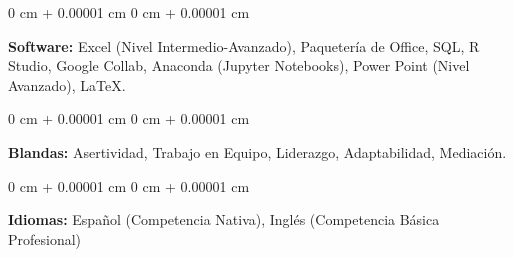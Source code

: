 \documentclass[10pt, letterpaper]{article}
\newenvironment{highlights}{
    \begin{itemize}[
        topsep=0.10 cm,
        parsep=0.10 cm,
        partopsep=0pt,
        itemsep=0pt,
        leftmargin=0 cm + 10pt
    ]
}{
    \end{itemize}
} %
\newenvironment{onecolentry}{
    \begin{adjustwidth}{
        0 cm + 0.00001 cm
    }{
        0 cm + 0.00001 cm
    }
}{
    \end{adjustwidth}
} %
\newenvironment{twocolentry}[2][]{
    \onecolentry
    \def\secondColumn{#2}
    \setcolumnwidth{\fill, 4.5 cm}
    \begin{paracol}{2}
}{
    \switchcolumn \raggedleft \secondColumn
    \end{paracol}
    \endonecolentry
} %
\begin{document}
        \vspace{0.2 cm}

        \begin{onecolentry}
            \textbf{Software:} Excel (Nivel Intermedio-Avanzado), Paquetería de Office, SQL, R Studio, Google Collab, Anaconda (Jupyter Notebooks), Power Point (Nivel Avanzado), LaTeX. 
        \end{onecolentry}

        \vspace{0.2 cm}

        \begin{onecolentry}
            \textbf{Blandas:} Asertividad, Trabajo en Equipo, Liderazgo, Adaptabilidad, Mediación.
        \end{onecolentry}

        \vspace{0.2 cm}

        \begin{onecolentry}
            \textbf{Idiomas:} Español (Competencia Nativa), Inglés (Competencia Básica Profesional)
        \end{onecolentry}

        

\end{document}
